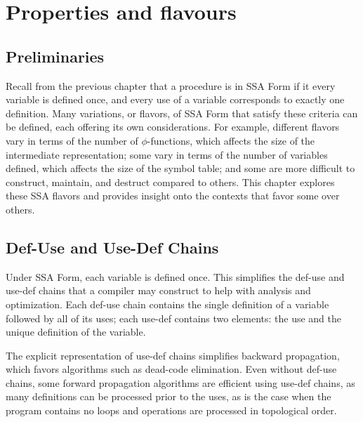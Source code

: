 \chapter{Properties and flavours }
\label{chap:properties_and_flavours}


\section{Preliminaries}

Recall from the previous chapter that a procedure is in SSA Form if it
every variable is defined once, and every use of a variable corresponds
to exactly one definition. Many variations, or flavors, of SSA Form that 
satisfy these criteria can be defined, each offering its own considerations.
For example, different flavors vary in terms of the number of $\phi$-functions,
which affects the size of the intermediate representation; some vary in
terms of the number of variables defined, which affects the size of the 
symbol table; and some are more difficult to construct, maintain, and destruct
compared to others. This chapter explores these SSA flavors and provides
insight onto the contexts that favor some over others. 

\section{Def-Use and Use-Def Chains}

Under SSA Form, each variable is defined once. This simplifies 
the def-use and use-def chains that a compiler may construct to help
with analysis and optimization. Each def-use chain contains the
single definition of a variable followed by all of its uses; each use-def
contains two elements: the use and the unique definition of the variable.

The explicit representation of use-def chains simplifies backward 
propagation, which favors algorithms such as dead-code elimination. 
Even without def-use chains, some forward propagation algorithms
are efficient using use-def chains, as many definitions can be processed
prior to the uses, as is the case when the program contains no loops
and operations are processed in topological order. 

